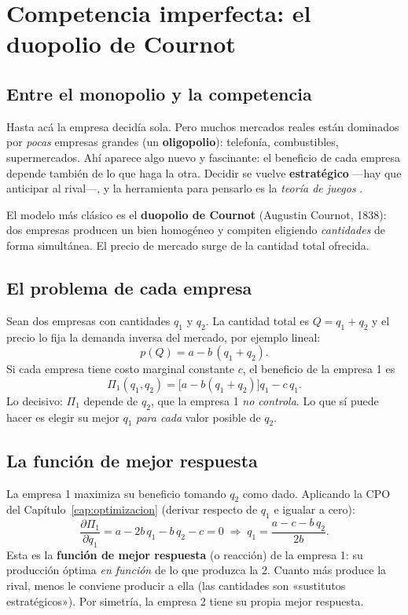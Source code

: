 \chapter{Competencia imperfecta: el duopolio de Cournot}
\label{cap:duopolio}

\section{Entre el monopolio y la competencia}

Hasta acá la empresa decidía sola. Pero muchos mercados reales están dominados por \emph{pocas} empresas grandes (un \textbf{oligopolio}): telefonía, combustibles, supermercados. Ahí aparece algo nuevo y fascinante: el beneficio de cada empresa depende también de lo que haga la otra. Decidir se vuelve \textbf{estratégico} —hay que anticipar al rival—, y la herramienta para pensarlo es la \emph{teoría de juegos} \cite{gibbons}.

El modelo más clásico es el \textbf{duopolio de Cournot} (Augustin Cournot, 1838): dos empresas producen un bien homogéneo y compiten eligiendo \emph{cantidades} de forma simultánea. El precio de mercado surge de la cantidad total ofrecida.

\section{El problema de cada empresa}

Sean dos empresas con cantidades $q_1$ y $q_2$. La cantidad total es $Q = q_1 + q_2$ y el precio lo fija la demanda inversa del mercado, por ejemplo lineal:
\begin{equation}
p(Q) = a - b\,(q_1 + q_2).
\end{equation}
Si cada empresa tiene costo marginal constante $c$, el beneficio de la empresa 1 es
\begin{equation}
\Pi_1(q_1,q_2) = \big[a - b(q_1+q_2)\big]q_1 - c\,q_1 .
\end{equation}
Lo decisivo: $\Pi_1$ depende de $q_2$, que la empresa 1 \emph{no controla}. Lo que sí puede hacer es elegir su mejor $q_1$ \emph{para cada} valor posible de $q_2$.

\section{La función de mejor respuesta}

La empresa 1 maximiza su beneficio tomando $q_2$ como dado. Aplicando la CPO del Capítulo~\ref{cap:optimizacion} (derivar respecto de $q_1$ e igualar a cero):
\begin{equation}
\frac{\partial \Pi_1}{\partial q_1} = a - 2b\,q_1 - b\,q_2 - c = 0
\;\Longrightarrow\;
q_1 = \frac{a - c - b\,q_2}{2b}.
\label{eq:mejor_respuesta}
\end{equation}
Esta es la \textbf{función de mejor respuesta} (o reacción) de la empresa 1: su producción óptima \emph{en función} de lo que produzca la 2. Cuanto más produce la rival, menos le conviene producir a ella (las cantidades son «sustitutos estratégicos»). Por simetría, la empresa 2 tiene su propia mejor respuesta.

